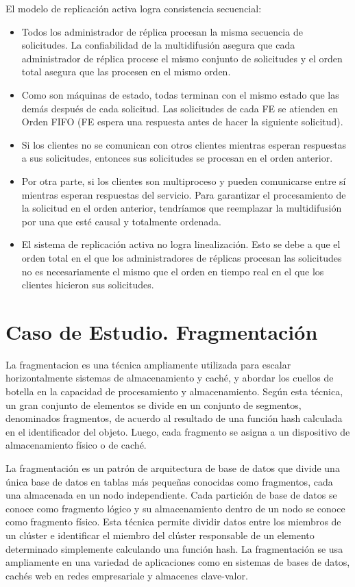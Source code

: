  El modelo de replicaci\'on activa logra consistencia secuencial:
 \begin{itemize}
 	\item Todos los administrador de réplica  procesan la misma secuencia de solicitudes. La confiabilidad de la multidifusión asegura que cada administrador de réplica  procese el mismo conjunto de solicitudes y el orden total asegura que las procesen en el mismo orden.
 	\item  	Como son máquinas de estado, todas terminan con el mismo estado que las demás después de cada solicitud. Las solicitudes de cada FE se atienden en Orden FIFO (FE espera una respuesta antes de hacer la siguiente solicitud).
 	\item Si los clientes no se comunican con otros clientes mientras esperan respuestas a sus solicitudes, entonces sus solicitudes se procesan en el orden anterior.  
 	\item Por otra parte, si los clientes son multiproceso y pueden comunicarse entre sí mientras esperan respuestas del servicio. Para garantizar el procesamiento de la solicitud en el orden anterior, tendríamos que reemplazar la multidifusión por una que esté causal y totalmente ordenada. 
 	\item El sistema de replicación activa no logra linealización. Esto se debe a que el orden total en el que los administradores de réplicas procesan las solicitudes no es necesariamente el mismo que el orden en tiempo real en el que los clientes hicieron sus solicitudes.
 \end{itemize}
 
 \section{Caso de Estudio. Fragmentación}
   
  
 La \gls{fragmentacion}  \cite{Saino2016} es una técnica ampliamente utilizada para escalar horizontalmente  sistemas de almacenamiento y caché, y abordar los cuellos de botella en la capacidad de procesamiento y almacenamiento. Según esta técnica, un gran conjunto de elementos se divide en un conjunto de segmentos, denominados fragmentos,  de acuerdo  al resultado de una función hash calculada en  el identificador del objeto. Luego, cada fragmento se asigna a un dispositivo de almacenamiento físico o de caché. 
 
 La fragmentación es un patrón de arquitectura de base de datos \cite{Ozsu2020} que divide una única base de datos en tablas más pequeñas conocidas como fragmentos, cada una almacenada en un nodo independiente. Cada partición de base de datos se conoce como fragmento lógico y su almacenamiento dentro de un nodo se conoce como fragmento físico.
 Esta técnica  permite dividir datos entre los miembros de un clúster e identificar el miembro del clúster responsable de un elemento determinado simplemente calculando una función hash. La fragmentación se usa ampliamente en una variedad de aplicaciones como  en sistemas de bases de datos, cachés web en redes empresariale  y almacenes  clave-valor.  
 
